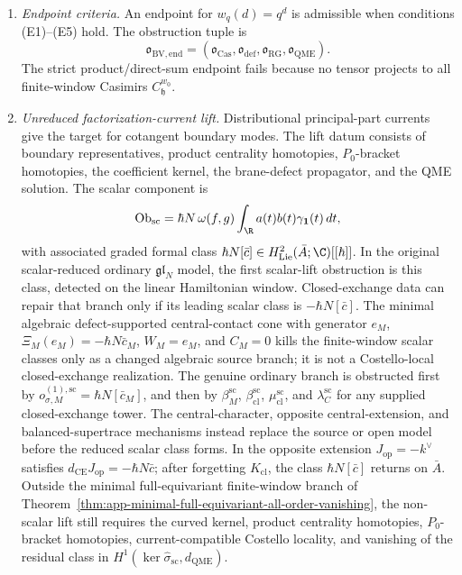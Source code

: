 \begin{enumerate}
  \item \emph{Endpoint criteria.}
  An endpoint for \(w_q(d)=q^d\) is admissible when conditions
  (E1)--(E5) hold.  The obstruction tuple is
  \[
    \mathfrak o_{\mathrm{BV,end}}=
    (\mathfrak o_{\mathrm{Cas}},
     \mathfrak o_{\mathrm{def}},
     \mathfrak o_{\mathrm{RG}},
     \mathfrak o_{\mathrm{QME}}).
  \]
  The strict product/direct-sum endpoint fails because no tensor
  projects to all finite-window Casimirs \(C_{\mathfrak h}^{w_0}\).

  \item \emph{Unreduced factorization-current lift.}
  Distributional principal-part currents give the target for cotangent
  boundary modes.  The lift datum consists of boundary representatives,
  product centrality homotopies, \(P_0\)-bracket homotopies, the
  coefficient kernel, the brane-defect propagator, and the QME solution.
  The scalar component is
  \[
    \operatorname{Ob}_{\mathrm{sc}}
    =\hbar N\,\omega(f,g)
      \int_\R a(t)b(t)\gamma_{\mathbf 1}(t)\,dt ,
	  \]
	  with associated graded formal class
	  \(\hbar N[\bar c]\in H^2_{\mathrm{Lie}}(\bar A;\C)[[\hbar]]\).
	  In the original scalar-reduced ordinary \(\mathfrak{gl}_N\) model,
	  the first scalar-lift obstruction is this class, detected on
	  the linear Hamiltonian window.  Closed-exchange data can repair that
	  branch only if its leading scalar class is
	  \(-\hbar N[\bar c]\).  The minimal algebraic defect-supported
	  central-contact cone with generator \(e_M\),
	  \(\Xi_M(e_M)=-\hbar N\bar c_M\), \(W_M=e_M\), and \(C_M=0\)
	  kills the finite-window scalar classes only as a changed algebraic
	  source branch; it is not a Costello-local closed-exchange
	  realization.  The genuine ordinary branch is obstructed first by
	  \(o_{\sigma,M}^{(1),\mathrm{sc}}=\hbar N[\bar c_M]\), and then by
	  \(\beta^{\mathrm{sc}}_M\),
	  \(\beta^{\mathrm{sc}}_{\mathrm{cl}}\),
	  \(\mu^{\mathrm{sc}}_{\mathrm{cl}}\), and
	  \(\lambda^{\mathrm{sc}}_C\) for any supplied closed-exchange tower.
	  The central-character, opposite central-extension, and
	  balanced-supertrace mechanisms instead replace the source or open model
	  before the reduced scalar class forms.  In the opposite extension
	  \(J_{\mathrm{op}}=-k^\vee\) satisfies
	  \(d_{\mathrm{CE}}J_{\mathrm{op}}=-\hbar N\bar c\); after forgetting
	  \(K_{\mathrm{cl}}\), the class \(\hbar N[\bar c]\) returns on
	  \(\bar A\).  Outside the minimal
	  full-equivariant finite-window branch of
	  Theorem~\ref{thm:app-minimal-full-equivariant-all-order-vanishing},
	  the non-scalar lift still requires the curved kernel, product
	  centrality homotopies, \(P_0\)-bracket homotopies,
	  current-compatible Costello locality, and vanishing of the residual
	  class in
	  \(H^1(\ker\widehat\sigma_{\mathrm{sc}},d_{\mathrm{QME}})\).


\end{enumerate}
